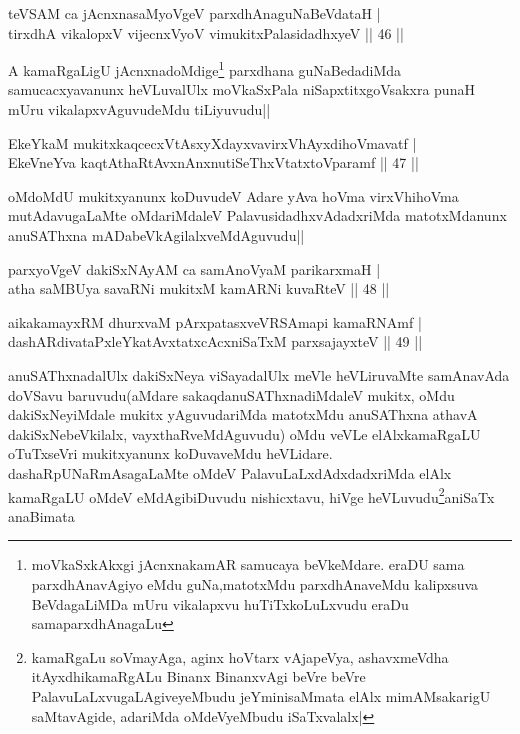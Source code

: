 \begin{shl}
teVSAM ca jAcnxnasaMyoVgeV parxdhAnaguNaBeVdataH |\\
tirxdhA vikalopxV vijecnxVyoV vimukitxPalasidadhxyeV \hfill || 46 ||
\end{shl}

\begin{artha}
A kamaRgaLigU jAcnxnadoMdige\footnote{moVkaSxkAkxgi jAcnxnakamAR samucaya beVkeMdare. eraDU sama parxdhAnavAgiyo eMdu guNa,matotxMdu parxdhAnaveMdu kalipxsuva BeVdagaLiMDa mUru vikalapxvu huTiTxkoLuLxvudu eraDu samaparxdhAnagaLu} parxdhana guNaBedadiMda samucacxyavanunx heVLuvalUlx moVkaSxPala niSapxtitxgoVsakxra punaH mUru vikalapxvAguvudeMdu tiLiyuvudu||
\end{artha}


\begin{shl}
EkeYkaM mukitxkaqcecxVtAsxyXdayxvavirxVhAyxdihoVmavatf |\\
EkeVneYva kaqtAthaRtAvxnAnxnutiSeThxVtatxtoV\s paramf \hfill || 47 ||
\end{shl}

\begin{artha}
oMdoMdU mukitxyanunx koDuvudeV Adare yAva hoVma virxVhihoVma mutAdavugaLaMte oMdariMdaleV PalavusidadhxvAdadxriMda matotxMdanunx anuSAThxna mADabeVkAgilalxveMdAguvudu||
\end{artha}

\begin{shl}
parxyoVgeV dakiSxNAyAM ca samAnoV\s yaM parikarxmaH |\\
atha saMBUya savaRNi mukitxM kamARNi kuvaRteV \hfill || 48 ||
\end{shl}

\begin{shl}
aikakamayxRM dhurxvaM pArxpatasxveVRSAmapi kamaRNAmf |\\
dashARdivataPxleYkatAvxtatxcAcxniSaTxM parxsajayxteV \hfill || 49 ||
\end{shl}

\begin{artha}
anuSAThxnadalUlx dakiSxNeya viSayadalUlx meVle heVLiruvaMte samAnavAda doVSavu baruvudu(aMdare sakaqdanuSAThxnadiMdaleV mukitx, oMdu dakiSxNeyiMdale mukitx yAguvudariMda matotxMdu anuSAThxna athavA dakiSxNebeVkilalx, vayxthaRveMdAguvudu) oMdu veVLe elAlxkamaRgaLU oTuTxseVri mukitxyanunx koDuvaveMdu heVLidare. dashaRpUNaRmAsagaLaMte oMdeV PalavuLaLxdAdxdadxriMda elAlx kamaRgaLU oMdeV eMdAgibiDuvudu nishicxtavu, hiVge heVLuvudu\footnote{kamaRgaLu soVmayAga, aginx hoVtarx vAjapeVya, ashavxmeVdha itAyxdhikamaRgALu Binanx BinanxvAgi beVre beVre PalavuLaLxvugaLAgiveyeMbudu jeYminisaMmata elAlx mimAMsakarigU saMtavAgide, adariMda oMdeVyeMbudu iSaTxvalalx|}aniSaTx anaBimata   
\end{artha}

